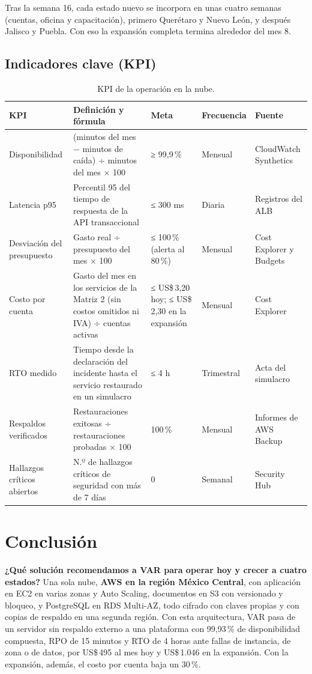 \documentclass[11pt,letterpaper]{article}
\newcommand{\usd}[1]{US\$\,#1}
\begin{document}
Tras la semana 16, cada estado nuevo se incorpora en unas cuatro semanas (cuentas, oficina y capacitación), primero Querétaro y Nuevo León, y después Jalisco y Puebla. Con eso la expansión completa termina alrededor del mes 8.

\subsection{Indicadores clave (KPI)}
\begin{table}[H]
\centering\footnotesize
\caption{KPI de la operación en la nube.}\label{tab:kpi}
\begin{tabularx}{\linewidth}{L{2.3cm}YL{2.4cm}L{1.6cm}L{2.0cm}}
\toprule
\textbf{KPI} & \textbf{Definición y fórmula} & \textbf{Meta} & \textbf{Frecuencia} & \textbf{Fuente}\\
\midrule
Disponibilidad & (minutos del mes − minutos de caída) ÷ minutos del mes × 100 & ≥ 99,9\,\% & Mensual & CloudWatch Synthetics\\
 Latencia p95 & Percentil 95 del tiempo de respuesta de la API transaccional & ≤ 300 ms & Diaria & Registros del ALB\\
Desviación del presupuesto & Gasto real ÷ presupuesto del mes × 100 & ≤ 100\,\% (alerta al 80\,\%) & Mensual & Cost Explorer y Budgets\\
 Costo por cuenta & Gasto del mes en los servicios de la Matriz 2 (sin costos omitidos ni IVA) ÷ cuentas activas & ≤ \usd{3,20} hoy; ≤ \usd{2,30} en la expansión & Mensual & Cost Explorer\\
RTO medido & Tiempo desde la declaración del incidente hasta el servicio restaurado en un simulacro & ≤ 4 h & Trimestral & Acta del simulacro\\
 Respaldos verificados & Restauraciones exitosas ÷ restauraciones probadas × 100 & 100\,\% & Mensual & Informes de AWS Backup\\
Hallazgos críticos abiertos & N.º de hallazgos críticos de seguridad con más de 7 días & 0 & Semanal & Security Hub\\
\bottomrule
\end{tabularx}
\end{table}

\section{Conclusión}\label{sec:conclusion}
\textbf{¿Qué solución recomendamos a VAR para operar hoy y crecer a cuatro estados?} Una sola nube, \textbf{AWS en la región México Central}, con aplicación en EC2 en varias zonas y Auto Scaling, documentos en S3 con versionado y bloqueo, y PostgreSQL en RDS Multi-AZ, todo cifrado con claves propias y con copias de respaldo en una segunda región. Con esta arquitectura, VAR pasa de un servidor sin respaldo externo a una plataforma con 99,93\,\% de disponibilidad compuesta, RPO de 15 minutos y RTO de 4 horas ante fallas de instancia, de zona o de datos, por \usd{495} al mes hoy y \usd{1.046} en la expansión. Con la expansión, además, el costo por cuenta baja un 30\,\%.
\end{document}
